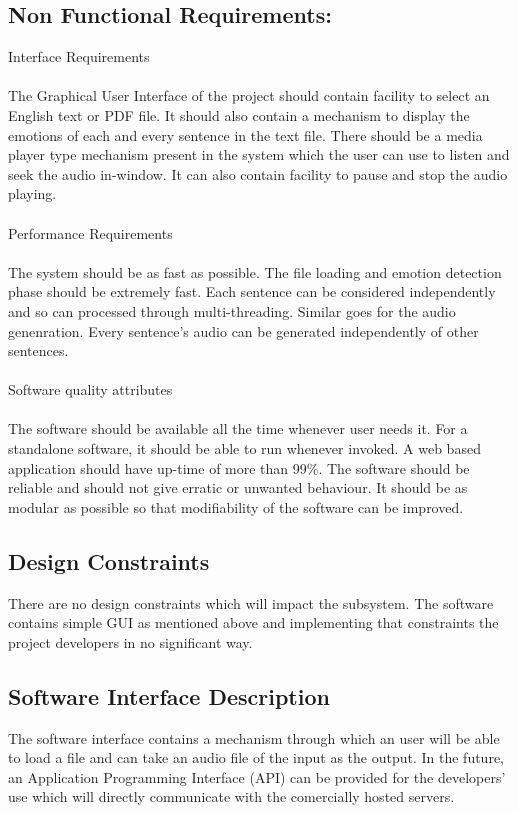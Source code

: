 \documentclass[oneside,a4paper,12pt]{book}
\begin{document}
\subsection{Non Functional Requirements:}
Interface Requirements\\\\
The Graphical User Interface of the project should contain facility to select an English text or PDF file. It should also contain a mechanism to display the emotions of each and every sentence in the text file. There should be a media player type mechanism present in the system which the user can use to listen and seek the audio in-window. It can also contain facility to pause and stop the audio playing.\\\\
Performance Requirements\\\\
The system should be as fast as possible. The file loading and emotion detection phase should be extremely fast. Each sentence can be considered independently and so can processed through multi-threading. Similar goes for the audio genenration. Every sentence's audio can be generated independently of other sentences.\\\\
Software quality attributes\\\\
The software should be available all the time whenever user needs it. For a standalone software, it should be able to run whenever invoked. A web based application should have up-time of more than 99\%. The software should be reliable and should not give erratic or unwanted behaviour. It should be as modular as possible so that modifiability of the software can be improved. 

 \subsection{Design Constraints}	
There are no design constraints which will impact the subsystem. The software contains simple GUI as mentioned above and implementing that constraints the project developers in no significant way.

 \subsection{Software Interface Description}	 
 The software interface contains a mechanism through which an user will be able to load a file and can take an audio file of the input as the output. In the future, an Application Programming Interface (API) can be provided for the developers' use which will directly communicate with the comercially hosted servers.
\end{document}
